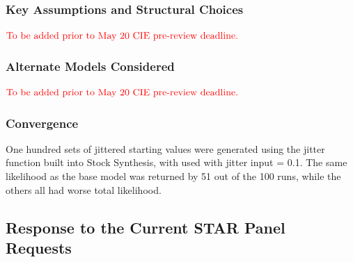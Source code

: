 \documentclass[12pt,]{article}
\begin{document}
\hypertarget{key-assumptions-and-structural-choices}{%
\subsubsection{Key Assumptions and Structural
Choices}\label{key-assumptions-and-structural-choices}}

\textbf{\(\color{red}{\text{To be added prior to May 20 CIE pre-review deadline.}}\)}

\hypertarget{alternate-models-considered}{%
\subsubsection{Alternate Models
Considered}\label{alternate-models-considered}}

\textbf{\(\color{red}{\text{To be added prior to May 20 CIE pre-review deadline.}}\)}

\hypertarget{convergence}{%
\subsubsection{Convergence}\label{convergence}}

One hundred sets of jittered starting values were generated using the
jitter function built into Stock Synthesis, with used with jitter input
= 0.1. The same likelihood as the base model was returned by 51 out of
the 100 runs, while the others all had worse total likelihood.

\hypertarget{response-to-the-current-star-panel-requests}{%
\subsection{Response to the Current STAR Panel
Requests}\label{response-to-the-current-star-panel-requests}}
\end{document}
